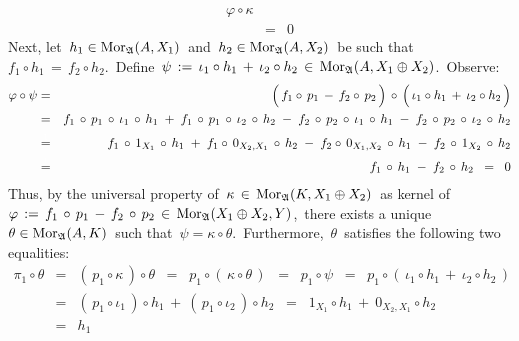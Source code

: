 \begin{enumerate}
\begin{eqnarray*}
		\varphi \circ \kappa
	\\
	& = &
		0
	\end{eqnarray*}
	Next, let
	\,$h_{1} \in \textnormal{Mor}_{\mathfrak{A}}(A,X_{1})$\,
	and
	\,$h_{2} \in \textnormal{Mor}_{\mathfrak{A}}(A,X_{2})$\,
	be such that
	\,$f_{1} \circ h_{1} \,=\, f_{2} \circ h_{2}$.\,
	Define
	\,$\psi\,:=\,\iota_{1}\circ h_{1}\,+\,\iota_{2}\circ h_{2}\,\in\,\textnormal{Mor}_{\mathfrak{A}}(A,X_{1}\oplus X_{2})$.\,
	Observe:
	\begin{eqnarray*}
	\varphi \circ \psi
	& = &
		\left(\,f_{1} \circ\, p_{1} \,\overset{{\color{white}.}}{-}\, f_{2} \circ\, p_{2}\,\right)
		\,\circ\,
		\left(\,\iota_{1} \circ h_{1} \,\overset{{\color{white}.}}{+}\, \iota_{2} \circ h_{2}\,\right)
	\\
	& = &
		f_{1} \,\circ\, p_{1} \,\circ\, \iota_{1} \,\circ\, h_{1}
		\; + \;
		f_{1} \,\circ\, p_{1} \,\circ\, \iota_{2} \,\circ\, h_{2}
		\; - \;
		f_{2} \,\circ\, p_{2} \,\circ\, \iota_{1} \,\circ\, h_{1}
		\; - \;
		f_{2} \,\circ\, p_{2} \,\circ\, \iota_{2} \,\circ\, h_{2}
	\\
	& \overset{{\color{white}1}}{=} &
		f_{1} \,\circ\, 1_{X_{1}} \,\circ\, h_{1}
		\; + \;
		f_{1} \circ\, 0_{X_{2},X_{1}} \,\circ\, h_{2}
		\; - \;
		f_{2} \circ\, 0_{X_{1},X_{2}} \,\circ\, h_{1}
		\; - \;
		f_{2} \,\circ\, 1_{X_{2}} \,\circ\, h_{2}
	\\
	& \overset{{\color{white}1}}{=} &
		f_{1} \,\circ\, h_{1}
		\; - \;
		f_{2} \,\circ\, h_{2}
	\;\; = \;\;
		0
	\end{eqnarray*}
	Thus, by the universal property of
	\,$\kappa \,\in\, \textnormal{Mor}_{\mathfrak{A}}(K,X_{1} \oplus X_{2})$\,
	as kernel of
	\,$\varphi\,:=\,f_{1}\,\circ\,p_{1}\,-\,f_{2}\,\circ\,p_{2}\,\in\,\textnormal{Mor}_{\mathfrak{A}}(X_{1} \oplus X_{2},Y)$,\,
	there exists a unique
	\,$\theta \in \textnormal{Mor}_{\mathfrak{A}}(A,K)$\,
	such that
	\,$\psi = \kappa \circ \theta$.\,
	Furthermore, \,$\theta$\, satisfies the following two equalities:
	\begin{eqnarray*}
	\pi_{1} \circ \theta
	& = &
		(\,p_{1} \circ \kappa\,) \circ \theta
	\;\; = \;\;
		p_{1} \circ (\,\kappa \circ \theta\,)
	\;\; = \;\;
		p_{1} \circ \psi
	\;\; = \;\;
		p_{1} \circ (\,\iota_{1}\circ h_{1}\,+\,\iota_{2}\circ h_{2}\,)
	\\
	& = &
		(\,p_{1} \circ \iota_{1}\,) \circ h_{1}
		\,+\
		(\,p_{1} \circ \iota_{2}\,) \circ h_{2}
	\;\; = \;\;
		1_{X_{1}} \circ h_{1}
		\,+\
		0_{X_{2},X_{1}} \circ h_{2}
	\\
	& = &
		h_{1}
	\\ \\

\end{eqnarray*}
\end{enumerate}
